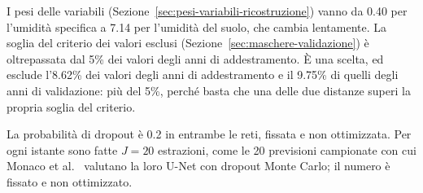 
I pesi delle variabili (Sezione~\ref{sec:pesi-variabili-ricostruzione}) vanno da 0.40 per l'umidità specifica a 7.14 per l'umidità del suolo, che cambia lentamente. La soglia del criterio dei valori esclusi (Sezione~\ref{sec:maschere-validazione}) è oltrepassata dal 5\% dei valori degli anni di addestramento. È una scelta, ed esclude l'8.62\% dei valori degli anni di addestramento e il 9.75\% di quelli degli anni di validazione: più del 5\%, perché basta che una delle due distanze superi la propria soglia del criterio.

La probabilità di dropout è 0.2 in entrambe le reti, fissata e non ottimizzata. Per ogni istante sono fatte $J=20$ estrazioni, come le 20 previsioni campionate con cui Monaco et al.~\cite{monaco2025sdeunet} valutano la loro U-Net con dropout Monte Carlo; il numero è fissato e non ottimizzato.

